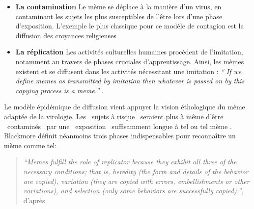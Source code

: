 \begin{itemize}
\item
\textbf{La contamination}
\newline
Le mème se déplace à la manière d{\textquoteright}un virus, en contaminant les sujets les plus susceptibles de l{\textquoteright}être lors d{\textquoteright}une phase d{\textquoteright}exposition. L{\textquoteright}exemple le plus classique pour ce modèle de contagion est la diffusion des croyances religieuses \citep{Dennett2006}
\item
\textbf{La réplication}
\newline
Les activités culturelles humaines procèdent de l{\textquoteright}imitation, notamment au travers de phases cruciales d{\textquoteright}apprentissage. Ainsi, les mèmes existent et se diffusent dans les activités nécessitant une imitation : \textit{{\textquotedblleft}} \textit{If we define memes as transmitted by imitation then whatever is passed on by this copying process is a meme.{\textquotedblright} }\citep{Blackmore2006}. 
\end{itemize}

Le modèle épidémique de diffusion vient appuyer la vision éthologique du mème adaptée de la virologie. Les {\guillemotleft}~sujets à risque~{\guillemotright} seraient plus à même d{\textquoteright}être {\guillemotleft}~contaminés~{\guillemotright} par une {\guillemotleft}~exposition~{\guillemotright} suffisamment longue à tel ou tel mème \citep{Wang2011}. Blackmore définit néanmoins trois phases indispensables pour reconna\^itre un mème comme tel:  

\begin{quote}
\textit{``Memes fulfill the role of replicator because they exhibit all three of the necessary conditions; that is, \textit{heredity} (the form and details of the behavior are copied), \textit{variation} (they are copied with errors, embellishments or other variations), and \textit{selection} (only some behaviors are successfully copied).''}, d'après \cite{Blackmore2006}
\end{quote}

